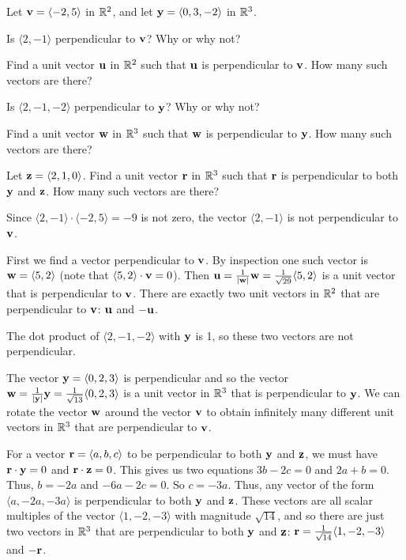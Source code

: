 \begin{exercises} 

\item \label{Ez:9.3.1}  Let $\mathbf{v} = \langle -2, 5 \rangle$ in $\mathbb{R}^2$, and let $\mathbf{y} = \langle 0, 3, -2 \rangle$ in $\mathbb{R}^3$. 

    \ba
    	\item Is $\langle 2, -1 \rangle$ perpendicular to $\mathbf{v}$?  Why or why not?
	\item Find a unit vector $\mathbf{u}$ in $\mathbb{R}^2$ such that $\mathbf{u}$ is perpendicular to $\mathbf{v}$.  How many such vectors are there?
	\item Is $\langle 2, -1, -2 \rangle$ perpendicular to $\mathbf{y}$?  Why or why not?
	\item Find a unit vector $\mathbf{w}$ in $\mathbb{R}^3$ such that $\mathbf{w}$ is perpendicular to $\mathbf{y}$.  How many such vectors are there?
	\item Let $\mathbf{z}  = \langle 2, 1, 0 \rangle$.  Find a unit vector $\mathbf{r}$ in $\mathbb{R}^3$ such that $\mathbf{r}$ is perpendicular to both $\mathbf{y}$ and $\mathbf{z}$.  How many such vectors are there?
    \ea

\begin{exerciseSolution}

    \ba
    \item Since $\langle 2, -1 \rangle \cdot \langle -2, 5 \rangle = -9$ is not zero, the vector  $\langle 2, -1 \rangle$ is not perpendicular to $\mathbf{v}$. 
	\item First we find a vector perpendicular to $\mathbf{v}$. By inspection one such vector is $\mathbf{w}=\langle 5, 2 \rangle$ (note that $\langle 5, 2 \rangle \cdot \mathbf{v} = 0$). Then $\mathbf{u} = \frac{1}{|\mathbf{w}|} \mathbf{w} = \frac{1}{\sqrt{29}} \langle 5,2 \rangle$ is a unit vector that is perpendicular to $\mathbf{v}$.  There are exactly two unit vectors in $\mathbb{R}^2$ that are perpendicular to $\mathbf{v}$: $\mathbf{u}$ and $-\mathbf{u}$. 
	\item The dot product of $\langle 2, -1, -2 \rangle$ with $\mathbf{y}$ is 1, so these two vectors are not perpendicular. 
	\item The vector $\mathbf{y} = \langle 0 , 2, 3 \rangle$ is perpendicular and so the vector $\mathbf{w} = \frac{1}{|\mathbf{y}|} \mathbf{y} = \frac{1}{\sqrt{13}} \langle 0, 2, 3 \rangle$ is a unit vector in $\mathbb{R}^3$ that is perpendicular to $\mathbf{y}$.  We can rotate the vector $\mathbf{w}$ around the vector $\mathbf{v}$ to obtain infinitely many different unit vectors in $\mathbb{R}^3$ that are perpendicular to $\mathbf{v}$. 
	\item For a vector $\mathbf{r} = \langle a,b,c \rangle$ to be perpendicular to both $\mathbf{y}$ and $\mathbf{z}$, we must have $\mathbf{r} \cdot \mathbf{y} = 0$ and $\mathbf{r} \cdot \mathbf{z} = 0$. This gives us two equations $3b-2c=0$ and $2a+b=0$. Thus, $b = -2a$ and $-6a-2c = 0$. So $c = -3a$. Thus, any vector of the form $\langle a, -2a, -3a \rangle$ is perpendicular to both $\mathbf{y}$ and $\mathbf{z}$. These vectors are all scalar multiples of the vector $\langle 1, -2, -3 \rangle$ with magnitude $\sqrt{14}$, and so there are just two vectors in $\mathbb{R}^3$ that are perpendicular to both $\mathbf{y}$ and $\mathbf{z}$: $\mathbf{r} = \frac{1}{\sqrt{14}} \langle 1, -2, -3 \rangle$ and $-\mathbf{r}$.   
    \ea
    

\end{exerciseSolution}
\end{exercises}
